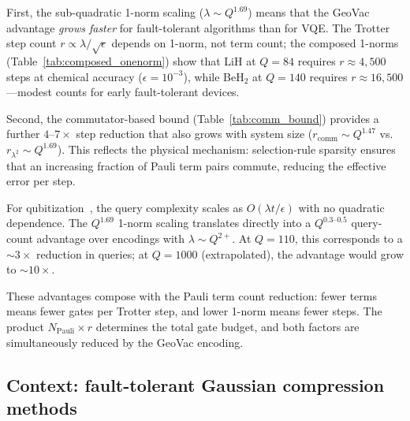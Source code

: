 \documentclass[aps,pra,twocolumn,superscriptaddress,longbibliography]{revtex4-2}
\begin{document}
First, the sub-quadratic 1-norm scaling ($\lambda \sim Q^{1.69}$)
means that the GeoVac advantage \emph{grows faster} for fault-tolerant
algorithms than for VQE.  The Trotter step count
$r \propto \lambda / \sqrt{\epsilon}$ depends on 1-norm, not term
count; the composed 1-norms (Table~\ref{tab:composed_onenorm}) show
that LiH at $Q = 84$ requires $r \approx 4{,}500$ steps at chemical
accuracy ($\epsilon = 10^{-3}$), while BeH$_2$ at $Q = 140$ requires
$r \approx 16{,}500$---modest counts for early fault-tolerant devices.

Second, the commutator-based bound (Table~\ref{tab:comm_bound})
provides a further $4$--$7\times$ step reduction that also grows
with system size ($r_{\mathrm{comm}} \sim Q^{1.47}$ vs.\
$r_{\lambda^2} \sim Q^{1.69}$).  This reflects the physical
mechanism: selection-rule sparsity ensures that an increasing fraction
of Pauli term pairs commute, reducing the effective error per step.

For qubitization~\cite{childs2021,lee2021}, the query complexity
scales as $O(\lambda t / \epsilon)$ with no quadratic dependence.
The $Q^{1.69}$ 1-norm scaling translates directly into a
$Q^{0.3\text{--}0.5}$ query-count advantage over encodings with
$\lambda \sim Q^{2+}$.  At $Q = 110$, this corresponds to a
$\sim 3\times$ reduction in queries; at $Q = 1000$ (extrapolated),
the advantage would grow to $\sim 10\times$.

These advantages compose with the Pauli term count reduction: fewer
terms means fewer gates per Trotter step, and lower 1-norm means
fewer steps.  The product $N_{\mathrm{Pauli}} \times r$ determines
the total gate budget, and both factors are simultaneously reduced
by the GeoVac encoding.

\subsection{Context: fault-tolerant Gaussian compression methods}
\label{sec:ft_gaussian}
\end{document}
